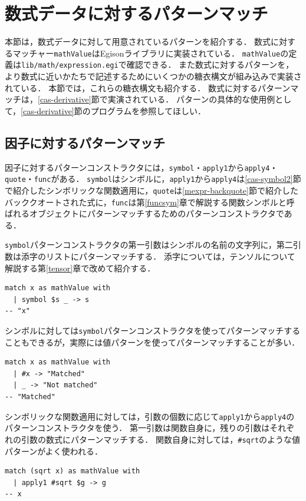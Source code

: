 \section{数式データに対するパターンマッチ}\label{mexpr-pattern}

本節は，数式データに対して用意されているパターンを紹介する．
数式に対するマッチャー\lstinline{mathValue}はEgisonライブラリに実装されている．
\lstinline{mathValue}の定義は\texttt{lib/math/expression.egi}で確認できる．
また数式に対するパターンを，より数式に近いかたちで記述するためにいくつかの糖衣構文が組み込みで実装されている．
本節では，これらの糖衣構文も紹介する．
数式に対するパターンマッチは，\ref{cas-derivative}節で実演されている．
パターンの具体的な使用例として，\ref{cas-derivative}節のプログラムを参照してほしい．

\subsection{因子に対するパターンマッチ}

因子に対するパターンコンストラクタには，\lstinline{symbol}・\lstinline{apply1}から\lstinline{apply4}・\lstinline{quote}・\lstinline{func}がある．
\lstinline{symbol}はシンボルに，\lstinline{apply1}から\lstinline{apply4}は\ref{cas-symbol2}節で紹介したシンボリックな関数適用に，\lstinline{quote}は\ref{mexpr-backquote}節で紹介したバッククオートされた式に，\lstinline{func}は第\ref{funcsym}章で解説する関数シンボルと呼ばれるオブジェクトにパターンマッチするためのパターンコンストラクタである．

\lstinline{symbol}パターンコンストラクタの第一引数はシンボルの名前の文字列に，第二引数は添字のリストにパターンマッチする．
添字については，テンソルについて解説する第\ref{tensor}章で改めて紹介する．
\begin{lstlisting}[language=egison,numbers=none]
match x as mathValue with
  | symbol $s _ -> s
-- "x"
\end{lstlisting}
シンボルに対しては\lstinline{symbol}パターンコンストラクタを使ってパターンマッチすることもできるが，実際には値パターンを使ってパターンマッチすることが多い．
\begin{lstlisting}[language=egison,numbers=none]
match x as mathValue with
  | #x -> "Matched"
  | _ -> "Not matched"
-- "Matched"
\end{lstlisting}

シンボリックな関数適用に対しては，引数の個数に応じて\lstinline{apply1}から\lstinline{apply4}のパターンコンストラクタを使う．
第一引数は関数自身に，残りの引数はそれぞれの引数の数式にパターンマッチする．
関数自身に対しては，\lstinline{#sqrt}のような値パターンがよく使われる．
\begin{lstlisting}[language=egison,numbers=none]
match (sqrt x) as mathValue with
  | apply1 #sqrt $g -> g
-- x
\end{lstlisting}

